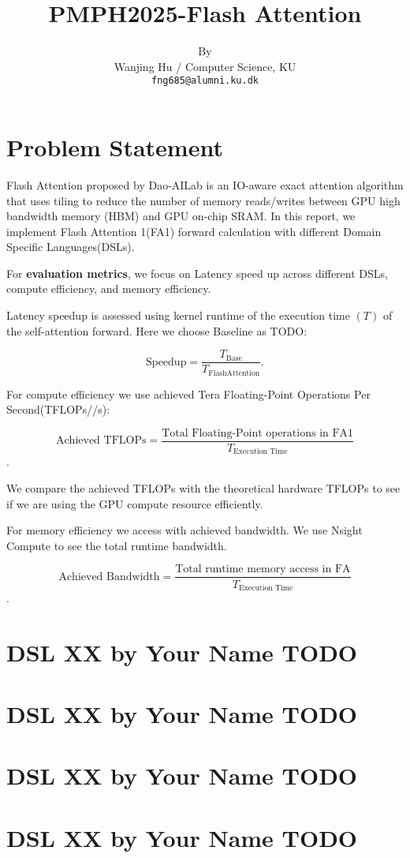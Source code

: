 \documentclass[11pt]{article}
\title{PMPH2025-Flash Attention}
\author{By \\
  Wanjing Hu / Computer Science, KU  \\
  \texttt{fng685@alumni.ku.dk} \\}
\renewcommand\cite{\citep}  %
\begin{document}
\maketitle

\section{Problem Statement}

Flash Attention proposed by Dao-AILab is an IO-aware exact attention algorithm that uses tiling to reduce the number of memory reads/writes between GPU high bandwidth memory (HBM) and GPU on-chip SRAM\cite{dao2022flashattention}. In this report, we implement Flash Attention 1(FA1) forward calculation with different Domain Specific Languages(DSLs).

For \textbf{evaluation metrics}, we focus on Latency speed up across different DSLs, compute efficiency, and memory efficiency.

Latency speedup is assessed using kernel runtime of the execution time $(T)$ of the self-attention forward. Here we choose Baseline as TODO: 

$$\text{Speedup} = \frac{T_{\text{Base}}}{T_{\text{FlashAttention}}}.$$

For compute efficiency we use achieved Tera Floating-Point Operations Per Second(TFLOPs//s): 

$$\text{Achieved TFLOPs} = \frac{\text{Total Floating-Point operations in FA1}}{T_{\text{Execution Time}}}$$.

We compare the achieved TFLOPs with the theoretical hardware TFLOPs to see if we are using the GPU compute resource efficiently.

For memory efficiency we access with achieved bandwidth. We use Nsight Compute to see the total runtime bandwidth.

$$\text{Achieved Bandwidth} = \frac{\text{Total runtime memory access in FA}}{T_{\text{Execution Time}}}$$.

\section{DSL XX by Your Name TODO}
\section{DSL XX by Your Name TODO}
\section{DSL XX by Your Name TODO}
\section{DSL XX by Your Name TODO}



\end{document}

